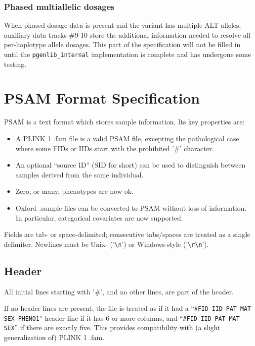 \documentclass[8pt]{article}
\begin{document}
\subsubsection{Phased multiallelic dosages}

When phased dosage data is present and the variant has multiple ALT alleles,
auxiliary data tracks \#9-10 store the additional information needed to resolve
all per-haplotype allele dosages.  This part of the specification will not be
filled in until the \texttt{pgenlib\_internal} implementation is complete and
has undergone some testing.

\newpage
\section{PSAM Format Specification}

PSAM is a text format which stores sample information.  Its key properties are:

\begin{itemize}
\item A PLINK 1 .fam file is a valid PSAM file, excepting the pathological case
  where some FIDs or IIDs start with the prohibited '\#' character.
\item An optional ``source ID'' (SID for short) can be used to distinguish
  between samples derived from the same individual.
\item Zero, or many, phenotypes are now ok.
\item Oxford .sample files can be converted to PSAM without loss of
  information.  In particular, categorical covariates are now supported.
\end{itemize}

Fields are tab- or space-delimited; consecutive tabs/spaces are treated as a
single delimiter.  Newlines must be Unix- ('\texttt{\textbackslash n}') or
Windows-style ('\texttt{\textbackslash r\textbackslash n}').

\subsection{Header}

All initial lines starting with '\#', and no other lines, are part of the
header.

If no header lines are present, the file is treated as if it had a
``\texttt{\#FID IID PAT MAT SEX PHENO1}'' header line if it has 6 or more
columns, and ``\texttt{\#FID IID PAT MAT SEX}'' if there are exactly five.
This provides compatibility with (a slight generalization of) PLINK 1 .fam.
\end{document}
